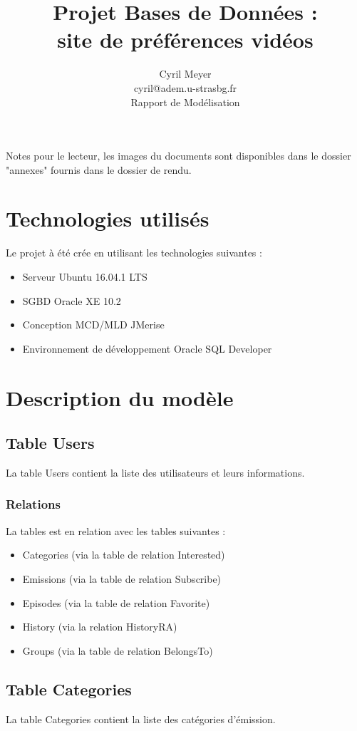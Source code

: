 \documentclass[12pt]{article}
\title{\textbf{Projet Bases de Données :\\site de préférences vidéos}}
\author{Cyril Meyer\\
		cyril@adem.u-strasbg.fr\\
		Rapport de Modélisation}
\begin{document}
\date{}
\maketitle
\newpage

Notes pour le lecteur, les images du documents sont disponibles dans le dossier "annexes" fournis dans le dossier de rendu.

\section{Technologies utilisés}
Le projet à été crée en utilisant les technologies suivantes :\\

\begin{itemize}
\item Serveur Ubuntu 16.04.1 LTS
\item SGBD Oracle XE 10.2
\item Conception MCD/MLD JMerise
\item Environnement de développement Oracle SQL Developer
\end{itemize}

\section{Description du modèle}

\subsection{Table Users}
La table Users contient la liste des utilisateurs et leurs informations.
\subsubsection{Relations}
La tables est en relation avec les tables suivantes :
\begin{itemize}
\item Categories (via la table de relation Interested)
\item Emissions (via la table de relation Subscribe)
\item Episodes (via la table de relation Favorite)
\item History (via la relation HistoryRA)
\item Groups (via la table de relation BelongsTo)
\end{itemize}

\subsection{Table Categories}
La table Categories contient la liste des catégories d'émission.
\end{document}
